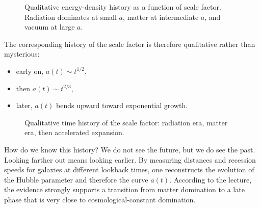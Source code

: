 \begin{figure}
\centering
{}
\caption{Qualitative energy-density history as a function of scale factor. Radiation dominates at small \(a\), matter at intermediate \(a\), and vacuum at large \(a\).}
\end{figure}

The corresponding history of the scale factor is therefore qualitative rather than mysterious:
\begin{itemize}
\item early on, \(a(t)\sim t^{1/2}\),
\item then \(a(t)\sim t^{2/3}\),
\item later, \(a(t)\) bends upward toward exponential growth.
\end{itemize}

\begin{figure}
\centering
{}
\caption{Qualitative time history of the scale factor: radiation era, matter era, then accelerated expansion.}
\end{figure}

How do we know this history? We do not see the future, but we do see the past. Looking farther out means looking earlier. By measuring distances and recession speeds for galaxies at different lookback times, one reconstructs the evolution of the Hubble parameter and therefore the curve \(a(t)\). According to the lecture, the evidence strongly supports a transition from matter domination to a late phase that is very close to cosmological-constant domination.

